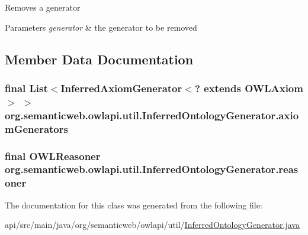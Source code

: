 Removes a generator 
\begin{DoxyParams}{Parameters}
{\em generator} & the generator to be removed \\
\hline
\end{DoxyParams}


\subsection{Member Data Documentation}
\hypertarget{classorg_1_1semanticweb_1_1owlapi_1_1util_1_1_inferred_ontology_generator_ab09a0a93f836a169c298b18df6ea7f04}{
\subsubsection[{axiom\-Generators}]{\setlength{\rightskip}{0pt plus 5cm}final List$<$Inferred\-Axiom\-Generator$<$? extends {\bf O\-W\-L\-Axiom}$>$ $>$ org.\-semanticweb.\-owlapi.\-util.\-Inferred\-Ontology\-Generator.\-axiom\-Generators\hspace{0.3cm}{\ttfamily [private]}}}\label{classorg_1_1semanticweb_1_1owlapi_1_1util_1_1_inferred_ontology_generator_ab09a0a93f836a169c298b18df6ea7f04}
\hypertarget{classorg_1_1semanticweb_1_1owlapi_1_1util_1_1_inferred_ontology_generator_a8ce0bb500eee27e86154042020116fda}{
\subsubsection[{reasoner}]{\setlength{\rightskip}{0pt plus 5cm}final {\bf O\-W\-L\-Reasoner} org.\-semanticweb.\-owlapi.\-util.\-Inferred\-Ontology\-Generator.\-reasoner\hspace{0.3cm}{\ttfamily [private]}}}\label{classorg_1_1semanticweb_1_1owlapi_1_1util_1_1_inferred_ontology_generator_a8ce0bb500eee27e86154042020116fda}


The documentation for this class was generated from the following file\-:\begin{DoxyCompactItemize}
\item 
api/src/main/java/org/semanticweb/owlapi/util/\hyperlink{_inferred_ontology_generator_8java}{Inferred\-Ontology\-Generator.\-java}\end{DoxyCompactItemize}
